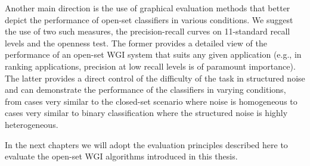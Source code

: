 Another main direction is the use of graphical evaluation methods that better depict the performance of open-set classifiers in various conditions. We suggest the use of two such measures, the precision-recall curves on 11-standard recall levels and the openness test. The former provides a detailed view of the performance of an open-set WGI system that suits any given application (e.g., in ranking applications, precision at low recall levels is of paramount importance). The latter provides a direct control of the difficulty of the task in structured noise and can demonstrate the performance of the classifiers in varying conditions, from cases very similar to the closed-set scenario where noise is homogeneous to cases very similar to binary classification where the structured noise is highly heterogeneous.

In the next chapters we will adopt the evaluation principles described here to evaluate the open-set WGI algorithms introduced in this thesis.
